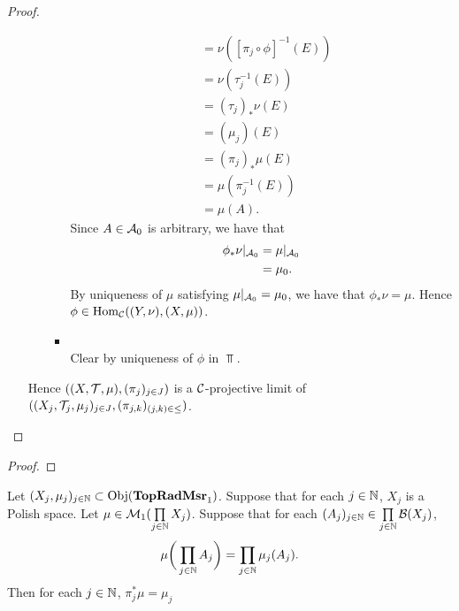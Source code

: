 \documentclass{book}
\begin{document}
\begin{proof}
\begin{enumerate}
\begin{itemize}
\begin{itemize}
\begin{align*}
					& = \nu([\pi_j \circ \phi]^{-1}(E)) \\
					& = \nu(\tau_j^{-1}(E)) \\
					& = (\tau_j)_*\nu(E) \\
					& = (\mu_j)(E) \\
					& = (\pi_j)_*\mu(E) \\
					& = \mu(\pi_j^{-1}(E)) \\
					& = \mu(A).
				\end{align*}
				Since $A \in \mathcal{A}_0$ is arbitrary, we have that 
				\begin{align*}
					\phi_*\nu|_{\mathcal{A}_0}
					& = \mu|_{\mathcal{A}_0} \\
					& = \mu_0. 
				\end{align*}
				By uniqueness of $\mu$ satisfying $\mu|_{\mathcal{A}_0} = \mu_0$, we have that $\phi_*\nu = \mu$. Hence $\phi \in \operatorname{Hom}_{\mathcal{C}}((Y, \nu), (X, \mu))$.
				\item {} \\
				Clear by uniqueness of $\phi$ in $\Top$. 
			\end{itemize}
		\end{itemize}
		Hence $((X, \mathcal{T}, \mu), (\pi_j)_{j \in J})$ is a $\mathcal{C}$-projective limit of $((X_j, \mathcal{T}_j, \mu_j)_{j \in J}, (\pi_{j,k})_{(j,k) \in {\leq}})$.
	\end{enumerate}
\end{proof}

\begin{ex}
\end{ex}

\begin{proof}
\end{proof}

\begin{note}
\end{note}

\begin{ex} 
	Let $(X_j, \mu_j)_{j \in \mathbb{N}} \subset \operatorname{Obj}(\operatorname*{\text{\textbf{TopRadMsr}}_{1}})$. Suppose that for each $j \in \mathbb{N}$, $X_j$ is a Polish space. Let $\mu \in \mathcal{M}_1( \prod\limits_{j \in \mathbb{N}} X_j)$. Suppose that for each $(A_j)_{j \in \mathbb{N}} \in \prod\limits_{j \in \mathbb{N}} \mathcal{B}(X_j)$, 
	$$\mu \bigg(\prod_{j \in \mathbb{N}} A_j \bigg) = \prod_{j \in \mathbb{N}} \mu_j(A_j).$$
	Then for each $j \in \mathbb{N}$, $\pi_j^*\mu = \mu_j$
\end{ex}
\end{document}
